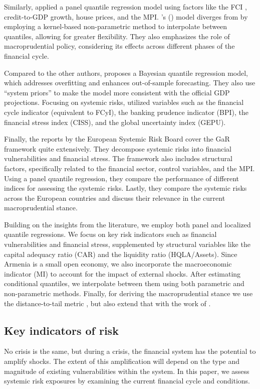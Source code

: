 Similarly, \citet{galan2020} applied a panel quantile regression model using factors like the FCI \citet{koop_2013}, credit-to-GDP growth, house prices, and the MPI. \citeauthor{galan2020}'s (\citeyear{galan2020}) model diverges from \citet{adrian_2019} by employing a kernel-based non-parametric method to interpolate between quantiles, allowing for greater flexibility. They also emphasizes the role of macroprudential policy, considering its effects across different phases of the financial cycle.

Compared to the other authors, \citet{szabo2020} proposes a Bayesian quantile regression model, which addresses overfitting and enhances out-of-sample forecasting. They also use “system priors” to make the model more consistent with the official GDP projections. Focusing on systemic risks, \citet{szabo2020} utilized variables such as the financial cycle indicator (equivalent to FCyI), the banking prudence indicator (BPI), the financial stress index (CISS), and the global uncertainty index (GEPU).

Finally, the reports by the European Systemic Risk Board \citep{esrb2018, esrb2019, esrb2021, esrb2024} cover the GaR framework quite extensively. They decompose systemic risks into financial vulnerabilities and financial stress. The framework also includes structural factors, specifically related to the financial sector, control variables, and the MPI. Using a panel quantile regression, they compare the performance of different indices for assessing the systemic risks. Lastly, they compare the systemic risks across the European countries and discuss their relevance in the current macroprudential stance.

Building on the insights from the literature, we employ both panel and localized quantile regressions. We focus on key risk indicators such as financial vulnerabilities and financial stress, supplemented by structural variables like the capital adequacy ratio (CAR) and the liquidity ratio (HQLA/Assets). Since Armenia is a small open economy, we also incorporate the macroeconomic indicator (MI) to account for the impact of external shocks. After estimating conditional quantiles, we interpolate between them using both parametric and non-parametric methods. Finally, for deriving the macroprudential stance we use the distance-to-tail metric \citep{esrb2024}, but also extend that with the work of \citet{suarez2022}.

\subsection{Key indicators of risk}
No crisis is the same, but during a crisis, the financial system has the potential to amplify shocks. The extent of this amplification will depend on the type and magnitude of existing vulnerabilities within the system. In this paper, we assess systemic risk exposures by examining the current financial cycle and conditions.

